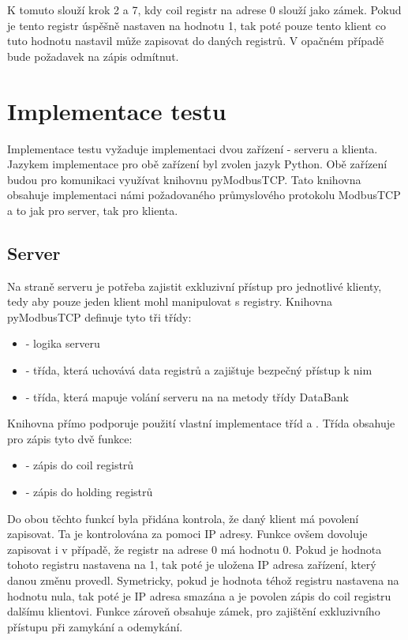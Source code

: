 K tomuto slouží krok 2 a 7, kdy coil registr na adrese 0 slouží jako zámek. Pokud je tento registr úspěšně nastaven na hodnotu 1, tak poté pouze tento klient co tuto hodnotu nastavil může zapisovat do daných registrů. V opačném případě bude požadavek na zápis odmítnut.

\section{Implementace testu}

Implementace testu vyžaduje implementaci dvou zařízení - serveru a klienta. Jazykem implementace pro obě zařízení byl zvolen jazyk Python. Obě zařízení budou pro komunikaci využívat knihovnu pyModbusTCP. Tato knihovna obsahuje implementaci námi požadovaného průmyslového protokolu ModbusTCP a to jak pro server, tak pro klienta.

\subsection{Server}

Na straně serveru je potřeba zajistit exkluzivní přístup pro jednotlivé klienty, tedy aby pouze jeden klient mohl manipulovat s registry. Knihovna pyModbusTCP definuje tyto tři třídy:

\begin{itemize}
    \item {} - logika serveru
    \item {} - třída, která uchovává data registrů a zajištuje bezpečný přístup k nim
    \item {} - třída, která mapuje volání serveru na na metody třídy DataBank
\end{itemize}

Knihovna přímo podporuje použití vlastní implementace tříd  a . Třída  obsahuje pro zápis tyto dvě funkce:

\begin{itemize}
    \item {} - zápis do coil registrů 
    \item {} - zápis do holding registrů
\end{itemize}

Do obou těchto funkcí byla přidána kontrola, že daný klient má povolení zapisovat. Ta je kontrolována za pomoci IP adresy. Funkce  ovšem dovoluje zapisovat i v případě, že registr na adrese 0 má hodnotu 0. Pokud je hodnota tohoto registru nastavena na 1, tak poté je uložena IP adresa zařízení, který danou změnu provedl. Symetricky, pokud je hodnota téhož registru nastavena na hodnotu nula, tak poté je IP adresa smazána a je povolen zápis do coil registru dalšímu klientovi. Funkce zároveň obsahuje zámek, pro zajištění exkluzivního přístupu při zamykání a odemykání. 

